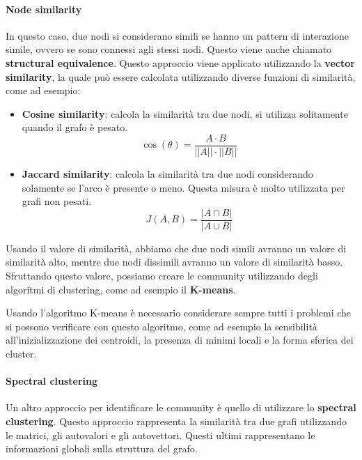 \paragraph{Node similarity}
In questo caso, due nodi si considerano simili se hanno un pattern di interazione
simile, ovvero se sono connessi agli stessi nodi. Questo viene anche chiamato
\textbf{structural equivalence}. Questo approccio viene applicato utilizzando la
\textbf{vector similarity}, la quale può essere calcolata utilizzando diverse
funzioni di similarità, come ad esempio:
\begin{itemize}
    \item \textbf{Cosine similarity}: calcola la similarità tra due nodi, si
          utilizza solitamente quando il grafo è pesato.
          \begin{equation*}
              \cos(\theta) = \frac{A \cdot B}{||A|| \cdot ||B||}
          \end{equation*}
    \item \textbf{Jaccard similarity}: calcola la similarità tra due nodi
          considerando solamente se l'arco è presente o meno. Questa misura
          è molto utilizzata per grafi non pesati.
          \begin{equation*}
              J(A, B) = \frac{|A \cap B|}{|A \cup B|}
          \end{equation*}
\end{itemize}
Usando il valore di similarità, abbiamo che due nodi simili avranno un valore
di similarità alto, mentre due nodi dissimili avranno un valore di similarità
basso. Sfruttando questo valore, possiamo creare le community utilizzando
degli algoritmi di clustering, come ad esempio il \textbf{K-means}.
\begin{nota}
    Usando l'algoritmo K-means è necessario considerare sempre tutti i problemi
    che si possono verificare con questo algoritmo, come ad esempio la sensibilità
    all'inizializzazione dei centroidi, la presenza di minimi locali e la forma
    sferica dei cluster.
\end{nota}
\paragraph{Spectral clustering}
Un altro approccio per identificare le community è quello di utilizzare lo
\textbf{spectral clustering}. Questo approccio rappresenta la similarità tra due
grafi utilizzando le matrici, gli autovalori e gli autovettori. Questi ultimi
rappresentano le informazioni globali sulla struttura del grafo.

